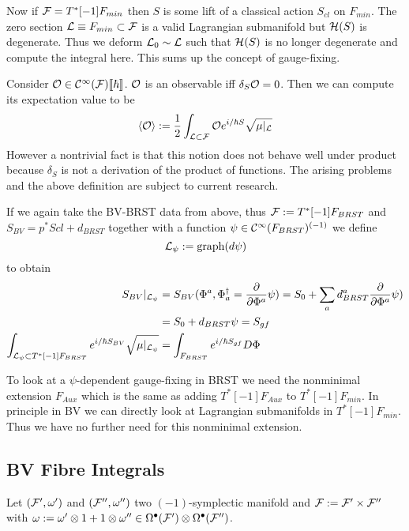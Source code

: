 Now if ${\mathcal{F}} = T^*[-1]F_{min}$ then $S$ is some lift of a classical action $S_{cl}$ on $F_{min}$. The zero section $\mathcal{L} \equiv F_{min} \subset {\mathcal{F}}$ is a valid Lagrangian submanifold but ${\mathcal{H}}(S)$ is degenerate. Thus we deform $\mathcal{L}_0 \sim \mathcal{L}$ such that ${\mathcal{H}}(S)$ is no longer degenerate and compute the integral here. This sums up the concept of gauge-fixing.

\begin{rem}
  Consider $\mathcal{O} \in \mathcal{C}^{\infty}({\mathcal{F}})\llbracket\hbar\rrbracket$. $\mathcal{O}$ is an observable iff $\delta_S \mathcal{O} = 0$. Then we can compute its expectation value to be
  \begin{equation}
    \langle \mathcal{O} \rangle := \frac{1}{2} \int_{\mathcal{L} \subset {\mathcal{F}}} \mathcal{O} e^{i/\hbar S} \sqrt{\mu|_{\mathcal{L}}}
  \end{equation}
  However a nontrivial fact is that this notion does not behave well under product because $\delta_S$ is not a derivation of the product of functions. The arising problems and the above definition are subject to current research.
\end{rem}

If we again take the BV-BRST data from above, thus ${\mathcal{F}} := T^*[-1]F_{BRST}$ and $S_{BV} = p^* S{cl} + d_{BRST}$ together with a function $\psi \in \mathcal{C}^{\infty}(F_{BRST})^{(-1)}$ we define
\begin{equation}
  \mathcal{L}_\psi := \operatorname{graph}(d\psi)
\end{equation}
to obtain
\begin{align}
  S_{BV} |_{\mathcal{L}_\psi} &= S_{BV} (\Phi^a, \Phi^\dagger_a = \frac{\partial }{\partial \Phi^a}\psi) = S_0 + \sum_a d^a_{BRST} \frac{\partial }{\partial \Phi^a}\psi) \\
  &= S_0 + d_{BRST} \psi = S_{gf} \\
  \int_{\mathcal{L}_\psi \subset T^*[-1]F_{BRST}} e^{i/\hbar S_{BV}} \sqrt{\mu|_{\mathcal{L}_\psi}} &= \int_{F_{BRST}} e^{i/\hbar S_{gf}} D\Phi
\end{align}

\begin{rem}
  To look at a $\psi$-dependent gauge-fixing in BRST we need the nonminimal extension $F_{Aux}$ which is the same as adding $T^*[-1]F_{Aux}$ to $T^*[-1]F_{min}$. In principle in BV we can directly look at Lagrangian submanifolds in $T^*[-1]F_{min}$. Thus we have no further need for this nonminimal extension.
\end{rem}

\subsection{BV Fibre Integrals}
Let $({\mathcal{F}}^{\prime}, \omega^{\prime})$ and $({\mathcal{F}}^{\prime\prime}, \omega^{\prime\prime})$ two $(-1)$-symplectic manifold and ${\mathcal{F}} := {\mathcal{F}}^\prime \times {\mathcal{F}}^{\prime\prime}$ with $\omega := \omega^\prime \otimes 1 + 1 \otimes \omega^{\prime\prime} \in \Omega^\bullet({\mathcal{F}}^\prime) \otimes \Omega^\bullet({\mathcal{F}}^{\prime\prime})$.

